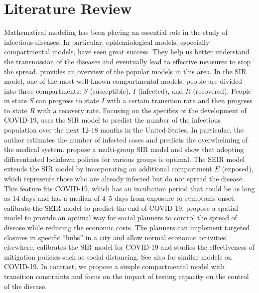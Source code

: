 \documentclass[nonblindrev, copyedit]{informs3a}
\newcounter{prop}[chapter]
\begin{document}

\section{Literature Review}
\label{Literature Review}
Mathematical modeling has been playing an essential role in the study of infectious diseases.
In particular, epidemiological models, especially compartmental models, have seen great success.
They help us better understand the transmission of the diseases and eventually lead to effective measures to stop the spread.
\citet{hethcote2000mathematics} provides an overview of the popular models in this area.
In the SIR model, one of the most well-known compartmental models,
people are divided into three compartments: $S$ (susceptible), $I$ (infected), and $R$ (recovered).
People in state $S$ can progress to state $I$ with a certain transition rate and then progress to state $R$ with a recovery rate.
Focusing on the specifics of the development of COVID-19, \citet{atkeson2020will} uses the SIR model to predict the number of the infectious population over the next 12-18 months in the United States.
In particular, the author estimates the number of infected cases and predicts the overwhelming of the medical system.
\citet{acemoglu2020optimal} propose a multi-group SIR model and show that adopting differentiated lockdown policies for various groups is optimal.
The SEIR model extends the SIR model by incorporating an additional compartment $E$ (exposed), which represents those who are already infected but do not spread the disease.
This feature fits COVID-19, which has an incubation period that could be as long as 14 days and has a median of 4--5 days from exposure to symptoms onset.
\citet{peng2020epidemic} calibrate the SEIR model to predict the end of COVID-19.
\citet{birge2020controlling} propose a spatial model to provide an optimal way for social planners to control the spread of disease while reducing the economic costs.
The planners can implement targeted closures in specific ``hubs'' in a city and allow normal economic activities elsewhere.
\citet{toda2020susceptible} calibrates the SIR model for COVID-19 and studies the effectiveness of mitigation policies such as social distancing.
See also \cite{alvarez2020simple} for similar models on COVID-19.
In contrast, we propose a simple compartmental model with transition constraints and focus on the impact of testing capacity on the control of the disease.
\end{document}
